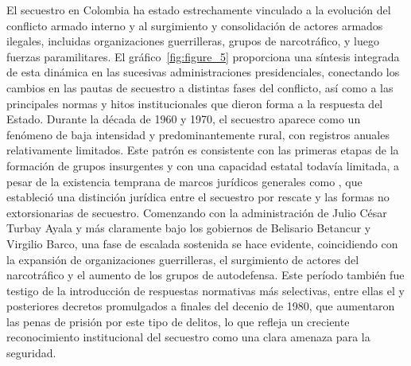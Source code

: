 \documentclass[12pt]{article}
\providecommand{\textcite}{\citet}
\theoremstyle{definition}
\theoremstyle{remark}
\newcommand{\1}{\mathbf{1}}
\begin{document}
El secuestro en Colombia ha estado estrechamente vinculado a la evolución del conflicto armado interno y al surgimiento y consolidación de actores armados ilegales, incluidas organizaciones guerrilleras, grupos de narcotráfico, y luego fuerzas paramilitares. El gráfico~\ref{fig:figure_5} proporciona una síntesis integrada de esta dinámica en las sucesivas administraciones presidenciales, conectando los cambios en las pautas de secuestro a distintas fases del conflicto, así como a las principales normas y hitos institucionales que dieron forma a la respuesta del Estado. Durante la década de 1960 y 1970, el secuestro aparece como un fenómeno de baja intensidad y predominantemente rural, con registros anuales relativamente limitados. Este patrón es consistente con las primeras etapas de la formación de grupos insurgentes y con una capacidad estatal todavía limitada, a pesar de la existencia temprana de marcos jurídicos generales como  \textcite{ley95_1936}, que estableció una distinción jurídica entre el secuestro por rescate y las formas no extorsionarias de secuestro. Comenzando con la administración de Julio César Turbay Ayala y más claramente bajo los gobiernos de Belisario Betancur y Virgilio Barco, una fase de escalada sostenida se hace evidente, coincidiendo con la expansión de organizaciones guerrilleras, el surgimiento de actores del narcotráfico y el aumento de los grupos de autodefensa. Este período también fue testigo de la introducción de respuestas normativas más selectivas, entre ellas el \textcite{Decreto1923_1978} y posteriores decretos promulgados a finales del decenio de 1980, que aumentaron las penas de prisión por este tipo de delitos, lo que refleja un creciente reconocimiento institucional del secuestro como una clara amenaza para la seguridad.
\end{document}
